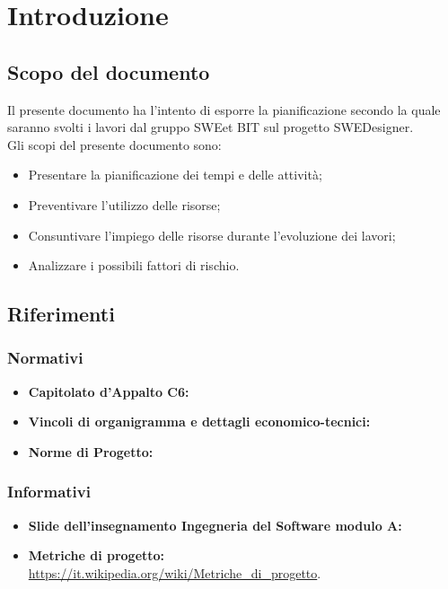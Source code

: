 \section{Introduzione}
\subsection{Scopo del documento}
Il presente documento ha l'intento di esporre la pianificazione secondo la quale saranno svolti i lavori dal gruppo SWEet BIT sul progetto SWEDesigner. \\
Gli scopi del presente documento sono: \\
\begin{itemize}
	\item Presentare la pianificazione dei tempi e delle attività;
	\item Preventivare l'utilizzo delle risorse;
	\item Consuntivare l'impiego delle risorse durante l'evoluzione dei lavori;
	\item Analizzare i possibili fattori di rischio. \\
\end{itemize}
\subsection{Riferimenti}
\subsubsection{Normativi}
\begin{itemize}
	\item \textbf{Capitolato d'Appalto C6:} \\
	\item \textbf{Vincoli di organigramma e dettagli economico-tecnici:} \\
	\item \textbf{Norme di Progetto:} \\
\end{itemize}
\subsubsection{Informativi}
\begin{itemize}
	\item \textbf{Slide dell'insegnamento Ingegneria del Software modulo A:} \\
	\item \textbf{Metriche di progetto:} \\
		\url{https://it.wikipedia.org/wiki/Metriche_di_progetto}. \\
\end{itemize}
